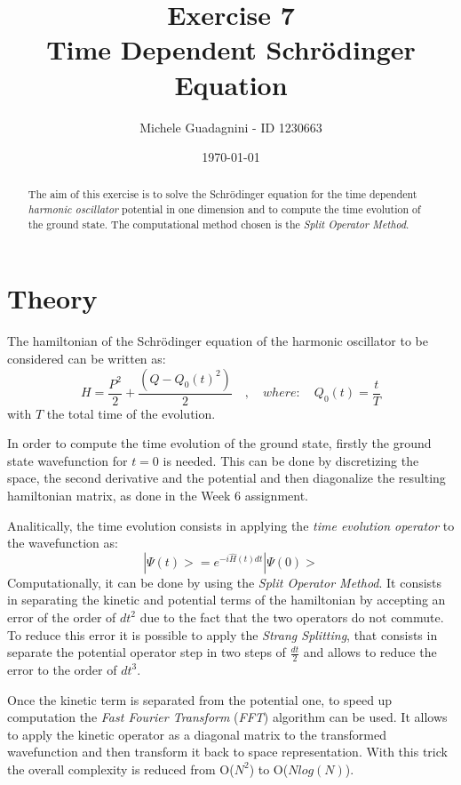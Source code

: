 \documentclass[11pt,a4paper]{article}
\author{Michele Guadagnini - ID 1230663}
\title{\textbf{Exercise 7 \\ Time Dependent Schr\"odinger Equation}}
\date{\today}
\begin{document}
\maketitle

\vspace{20pt}
\begin{abstract}
	The aim of this exercise is to solve the Schr\"odinger equation for the time dependent \textit{harmonic oscillator} potential in one dimension and to 
	compute the time evolution of the ground state. The computational method chosen is the \textit{Split Operator Method}.
\end{abstract}

\section{Theory} %
\label{sec:Th}

The hamiltonian of the Schr\"odinger equation of the harmonic oscillator to be considered can be written as:
\begin{equation}
H = \frac{P^2}{2} + \frac{(Q - Q_0(t)^2)}{2} \quad , \quad where: \quad Q_0(t) = \frac{t}{T}
\label{eq:Ham}
\end{equation}
with $T$ the total time of the evolution.

In order to compute the time evolution of the ground state, firstly the ground state wavefunction for $t=0$ is needed. 
This can be done by discretizing the space, the second derivative and the potential and then diagonalize the resulting hamiltonian matrix, as done in the Week 6 assignment.

Analitically, the time evolution consists in applying the \textit{time evolution operator} to the wavefunction as:
\begin{equation}
|\Psi(t)> = e^{-i\hat H(t) dt} |\Psi(0)>
\label{eq:TimeEv}
\end{equation}
Computationally, it can be done by using the \textit{Split Operator Method}. 
It consists in separating the kinetic and potential terms of the hamiltonian by accepting an error of the order of $dt^2$ due to the fact that the two operators do not commute. 
To reduce this error it is possible to apply the \textit{Strang Splitting}, that consists in separate the potential operator step in two steps of $\frac{dt}{2}$ and allows to reduce the error to the order of $dt^3$.

Once the kinetic term is separated from the potential one, to speed up computation the \textit{Fast Fourier Transform} (\textit{FFT}) algorithm can be used. It allows to apply the kinetic operator as a diagonal matrix to the transformed wavefunction and then transform it back to space representation. With this trick the overall complexity is reduced from O($N^2$) to O($Nlog(N)$).
\end{document}
